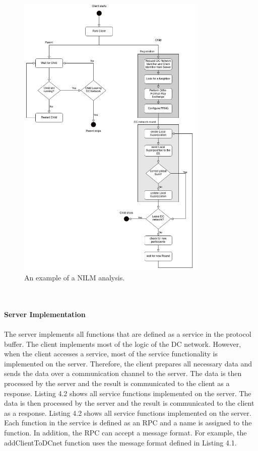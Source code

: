 \begin{figure}[tbp]
  \centering
  \includegraphics[width=0.8\textwidth]{images/Client_structure.png}
  \caption[Short description]{An example of a NILM analysis.}
  \label{fig:Appliance_Model}
\end{figure}
\\
\\
\textbf{Server Implementation}
\\
\\
The server implements all functions that are defined as a service in the protocol buffer. The client implements most of the logic of the DC network. However, when the client accesses a service, most of the service functionality is implemented on the server. Therefore, the client prepares all necessary data and sends the data over a communication channel to the server. The data is then processed by the server and the result is communicated to the client as a response. Listing 4.2 shows all service functions implemented on the server. The data is then processed by the server and the result is communicated to the client as a response. Listing 4.2 shows all service functions implemented on the server. Each function in the service is defined as an RPC and a name is assigned to the function. In addition, the RPC can accept a message format. For example, the addClientToDCnet function uses the message format defined in Listing 4.1. 
